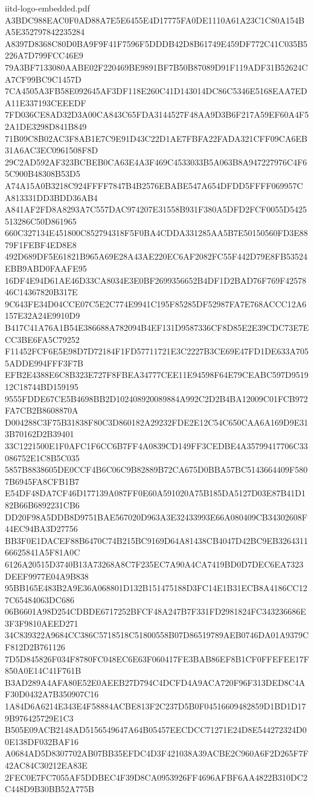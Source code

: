 \begin{filecontents*}[overwrite]{iitd-logo-embedded.pdf}
A3BDC988EAC0F0AD88A7E5E6455E4D17775FA0DE1110A61A23C1C80A154BA5E352797842235284
A8397D8368C80D0BA9F9F41F7596F5DDDB42D8B61749E459DF772C41C035B5226A7D799FCC46E9
79A3BF7133080AABE02F220469BE9891BF7B50B87089D91F119ADF31B52624CA7CF99BC9C1457D
7CA4505A3FB58E092645AF3DF118E260C41D143014DC86C5346E5168EAA7EDA11E337193CEEEDF
7FD036CE8AD32D3A00CA843C65FDA3144527F48AA9D3B6F217A59EF60A4F52A1DE3298D841B849
71B09C8B02AC3F8AB1E7C9E91D43C22D1AE7FBFA22FADA321CFF09CA6EB31A6AC3EC0961508F8D
29C2AD592AF323BCBEB0CA63E4A3F469C4533033B5A063B8A947227976C4F65C900B48308B53D5
A74A15A0B3218C924FFFF7847B4B2576EBABE547A654DFDD5FFFF069957CA813331DD3BDD36AB4
A841AF2FD8A8293A7C557DAC974207E31558B931F380A5DFD2FCF0055D5425513286C50D861965
660C327134E451800C852794318F5F0BA4CDDA331285AA5B7E50150560FD3E8879F1FEBF4ED8E8
492D689DF5E61821B965A69E28A43AE220EC6AF2082FC55F442D79E8FB53524EBB9ABD0FAAFE95
16DF4E94D61AE46D33CA8034E3E0BF2699356652B4DF1D2BAD76F769F4257846C14367820B317E
9C643FE34D04CCE07C5E2C774E9941C195F85285DF52987FA7E768ACCC12A6157E32A24E9910D9
B417C41A76A1B54E386688A782094B4EF131D9587336CF8D85E2E39CDC73E7ECC3BE6FA5C79252
F11452FCF6E5E98D7D72184F1FD57711721E3C2227B3CE69E47FD1DE633A7055ADDE994FFF3F7B
EFB2E4388E6C8B323E727F8FBEA34777CEE11E94598F64E79CEABC597D951912C18744BD159195
9555FDDE67CE5B4698BB2D102408920089884A992C2D2B4BA12009C01FCB972FA7CB2B8608870A
D004288C3F75B31838F80C3D860182A29232FDE2E12C54C650CAA6A169D9E313B70162D2B39401
33C1221500E1F0AFC1F6CC6B7FF4A0839CD149FF3CEDBE4A35799417706C33086752E1C8B5C035
5857B8838605DE0CCF4B6C06C9B82889B72CA675D0BBA57BC5143664409F5807B6945FA8CFB1B7
E54DF48DA7CF46D177139A087FF0E60A591020A75B185DA5127D03E87B41D182B66B6892231CB6
DD20F98A5DDB8D9751BAE567020D963A3E32433993E66A080409CB34302608F44EC94BA3D27756
BB3F0E1DACEF88B6470C74B215BC9169D64A81438CB4047D42BC9EB326431166625841A5F81A0C
6126A20515D3740B13A73268A8C7F235EC7A90A4CA7419BD0D7DEC6EA7323DEEF9977E04A9B838
95BB165E483B2A9E36A068801D132B151475188D3FC14E1B31ECB8A4186CC127C65484063DC686
06B6601A98D254CDBDE6717252BFCF48A247B7F331FD2981824FC343236686E3F3F9810AEED271
34C839322A9684CC386C5718518C51800558B07D86519789AEB0746DA01A9379CF812D2B761126
7D5D845826F034F8780FC048EC6E63F060417FE3BAB86EF8B1CF0FFEFEE17F850A0E14C41F761B
B3AD289A4AFA80E52E0AEEB27D794C4DCFD4A9ACA720F96F313DED8C4AF30D0432A7B350907C16
1A84D6A6214E343E4F58884ACBE813F2C237D5B0F04516609482859D1BD1D179B976425729E1C3
B505E09ACB2148AD5156549647A64B05457EECDCC71271E24D8E544272324D00E138DF032BAF16
A0684AD5D8307702AB07BB35EFDC4D3F421038A39ACBE2C960A6F2D265F7F42AC84C30212EA83E
2FEC0E7FC7055AF5DDBEC4F39D8CA0953926FF4696AFBF6AA4822B310DC2C448D9B30BB52A775B

\end{filecontents*}
